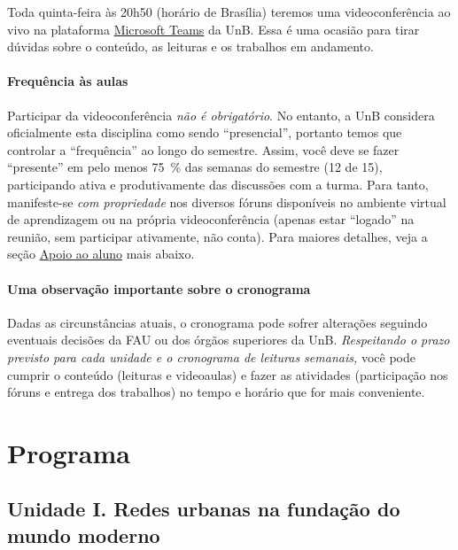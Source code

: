 \documentclass[
  11pt,
  brazil,
  a4paper,
]{article}
\begin{document}
Toda quinta-feira às 20h50 (horário de Brasília) teremos uma
videoconferência ao vivo na plataforma
\href{https://teams.microsoft.com}{Microsoft Teams} da UnB. Essa é uma
ocasião para tirar dúvidas sobre o conteúdo, as leituras e os trabalhos
em andamento.

\hypertarget{frequuxeancia-uxe0s-aulas}{%
\paragraph{Frequência às aulas}\label{frequuxeancia-uxe0s-aulas}}

Participar da videoconferência \emph{não é obrigatório}. No entanto, a
UnB considera oficialmente esta disciplina como sendo ``presencial'',
portanto temos que controlar a ``frequência'' ao longo do semestre.
Assim, você deve se fazer ``presente'' em pelo menos 75~\% das semanas
do semestre (12 de 15), participando ativa e produtivamente das
discussões com a turma. Para tanto, manifeste-se \emph{com propriedade}
nos diversos fóruns disponíveis no ambiente virtual de aprendizagem ou
na própria videoconferência (apenas estar ``logado'' na reunião, sem
participar ativamente, não conta). Para maiores detalhes, veja a seção
\href{plano-apoio-avalia.md\#apoio-ao-aluno}{Apoio ao aluno} mais
abaixo.

\hypertarget{uma-observauxe7uxe3o-importante-sobre-o-cronograma}{%
\paragraph{Uma observação importante sobre o
cronograma}\label{uma-observauxe7uxe3o-importante-sobre-o-cronograma}}

Dadas as circunstâncias atuais, o cronograma pode sofrer alterações
seguindo eventuais decisões da FAU ou dos órgãos superiores da UnB.
\emph{Respeitando o prazo previsto para cada unidade e o cronograma de
leituras semanais,} você pode cumprir o conteúdo (leituras e videoaulas)
e fazer as atividades (participação nos fóruns e entrega dos trabalhos)
no tempo e horário que for mais conveniente.

\hypertarget{programa}{%
\section{Programa}\label{programa}}

\hypertarget{unidade-i.-redes-urbanas-na-fundauxe7uxe3o-do-mundo-moderno}{%
\subsection{Unidade I. Redes urbanas na fundação do mundo
moderno}\label{unidade-i.-redes-urbanas-na-fundauxe7uxe3o-do-mundo-moderno}}
\end{document}
